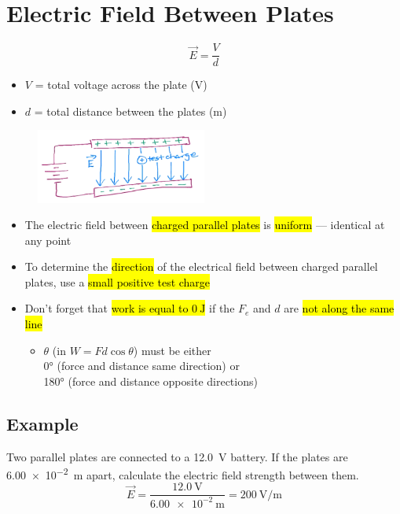 \documentclass[a4paper,12pt]{article}
\begin{document}
\section{Electric Field Between Plates}
\Large $$\vec{E} = \frac{V}{d}$$ \normalsize
\begin{itemize}
    \item{$V$ = total voltage across the plate (\si{\volt})}
    \item{$d$ = total distance between the plates (\si{\meter})}
\end{itemize}

\begin{figure}[H]
    \centering
    \includegraphics[width=0.50\textwidth]{plate}
\end{figure}

\begin{itemize}
    \item{The electric field between \hl{charged parallel plates} is \hl{uniform} --- identical at any point}
    \item{To determine the \hl{direction} of the electrical field between charged parallel plates, use a \hl{small positive test charge}}
    \item{
        Don't forget that \hl{work is equal to $\SI{0}{\joule}$} if the $F_e$ and $d$ are \hl{not along the same line}
        \begin{itemize}
            \item{$\theta$ (in $W = Fd\cos{\theta}$) must be either\\\ang{0} (force and distance same direction) or \\\ang{180} (force and distance opposite directions)}
        \end{itemize}
    }
\end{itemize}

\subsection{Example}
Two parallel plates are connected to a \SI{12.0}{\volt} battery. If the plates are \SI{6.00e-2}{\m} apart, calculate the electric field strength between them.
$$\vec{E} = \frac{\SI{12.0}{\volt}}{\SI{6.00e-2}{\m}} = \SI{200}{\volt\per\m}$$
\end{document}
